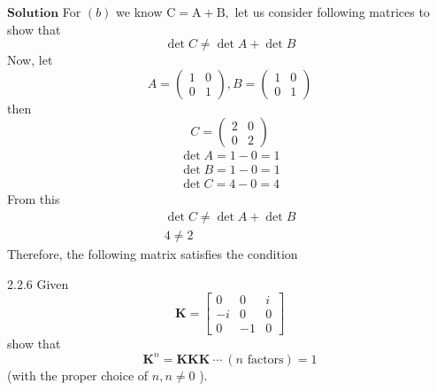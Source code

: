 \documentclass{styles/kaobook}
\begin{document}
$\boxed{\textbf{Solution}}$ For $(b)$ we know $\mathrm{C}=\mathrm{A}+\mathrm{B},$ let us consider following matrices to show that
$$
\operatorname{det} C \neq \operatorname{det} A+\operatorname{det} B
$$
Now, let
$$
A=\left(\begin{array}{ll}
1 & 0 \\
0 & 1
\end{array}\right), B=\left(\begin{array}{ll}
1 & 0 \\
0 & 1
\end{array}\right)
$$
then 
$$
C=\left(\begin{array}{ll}
2 & 0 \\
0 & 2
\end{array}\right)
$$
$$
\begin{array}{l}
\operatorname{det} A=1-0=1 \\
\operatorname{det} B=1-0=1 \\
\operatorname{det} C=4-0=4
\end{array}
$$
From this
$$
\begin{array}{l}
\operatorname{det} C \neq \operatorname{det} A+\operatorname{det} B \\
4 \neq 2
\end{array}
$$
Therefore, the following matrix satisfies the condition


\begin{greenbox}{2.2.6}
Given
$$
\mathbf{K}=\begin{bmatrix}{0} & {0} & {i} \\ {-i} & {0} & {0} \\ {0} & {-1} & {0}\end{bmatrix}
$$
show that
$$
\mathbf{K}^{n}=\mathbf{KKK} \ \cdots \ (n \text { factors})=1
$$
(with the proper choice of $n, n \neq 0$ ).
\end{greenbox}
\end{document}
